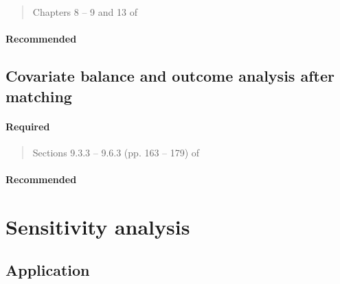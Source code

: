 \documentclass[12pt]{article}
\begin{document}
\begin{verse}
  Chapters 8 -- 9 and 13 of 
\end{verse}

\paragraph*{Recommended}

\begin{verse}
\end{verse}

\subsection{Covariate balance and outcome analysis after matching}

\paragraph*{Required}

\begin{verse}
\end{verse}

\begin{verse}
  Sections 9.3.3 -- 9.6.3 (pp. 163 -- 179) of 
\end{verse}

\paragraph*{Recommended}

\begin{verse}
\end{verse}

\begin{verse}
\end{verse}

\begin{verse}
\end{verse}

\section{Sensitivity analysis}

\subsection*{Application}
\end{document}
